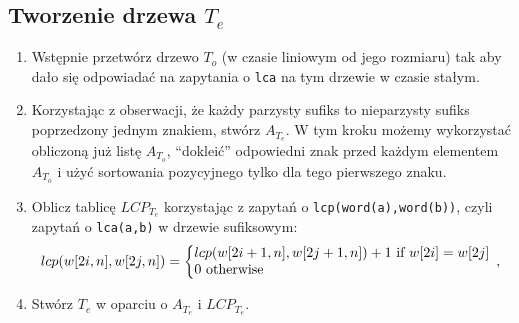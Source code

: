     \subsection{Tworzenie drzewa $T_e$}
    \begin{enumerate}
     \item Wstępnie przetwórz drzewo $T_o$ (w czasie liniowym od jego rozmiaru) tak aby dało się odpowiadać na zapytania o \verb|lca| na tym drzewie w czasie stałym.
     \item Korzystając z obserwacji, że każdy parzysty sufiks to nieparzysty sufiks poprzedzony jednym znakiem, stwórz $A_{T_e}$. W tym kroku możemy wykorzystać obliczoną już listę $A_{T_o}$, ``dokleić'' odpowiedni znak przed każdym elementem $A_{T_o}$ i użyć sortowania pozycyjnego tylko dla tego pierwszego znaku.
     \item Oblicz tablicę $LCP_{T_e}$ korzystając z zapytań o \verb|lcp(word(a),word(b))|, czyli zapytań o \verb|lca(a,b)| w drzewie sufiksowym:
      \begin{align*}
      \left.
       lcp(w[2i,n],w[2j,n]) = \bigg\{
       \begin{array}{@{}l}
        lcp(w[2i+1,n],w[2j+1,n]) + 1 \text{ if } w[2i] = w[2j]   \\
        0 \text{ otherwise}
       \end{array},
        \right.              
      \end{align*}
      
      \item Stwórz $T_e$ w oparciu o $A_{T_e}$ i $LCP_{T_e}$.
    \end{enumerate}
    

